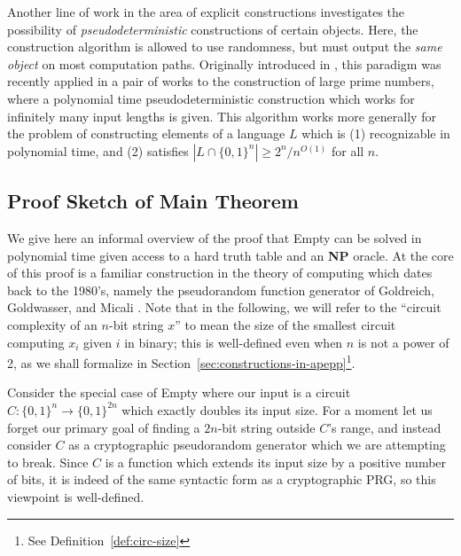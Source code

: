 \documentclass[11pt]{article}
\def\cl{\bf}
\begin{document}
Another line of work in the area of explicit constructions investigates the possibility of \emph{pseudodeterministic} constructions of certain objects. Here, the construction algorithm is allowed to use randomness, but must output the \emph{same object} on most computation paths. Originally introduced in \cite{GG}, this paradigm was recently applied in a pair of works \cite{pseudo-primes, poly-time-primes} to the construction of large prime numbers, where a polynomial time pseudodeterministic construction which works for infinitely many input lengths is given. This algorithm works more generally for the problem of constructing elements of a language $L$ which is (1) recognizable in polynomial time, and (2) satisfies $|L \cap \{0,1\}^n| \geq 2^n/n^{O(1)}$ for all $n$. 


\subsection{Proof Sketch of Main Theorem}
We give here an informal overview of the proof that {\sc Empty} can be solved in polynomial time given access to a hard truth table and an {\cl NP} oracle. At the core of this proof is a familiar construction in the theory of computing which dates back to the 1980's, namely the pseudorandom function generator of Goldreich, Goldwasser, and Micali \cite{GGM}. Note that in the following, we will refer to the ``circuit complexity of an $n$-bit string $x$'' to mean the size of the smallest circuit computing $x_i$ given $i$ in binary; this is well-defined even when $n$ is not a power of 2, as we shall formalize in Section~\ref{sec:constructions-in-apepp}\footnote{See Definition~\ref{def:circ-size}}.

Consider the special case of {\sc Empty} where our input is a circuit $C: \{0,1\}^n \rightarrow \{0,1\}^{2n}$ which exactly doubles its input size. For a moment let us forget our primary goal of finding a $2n$-bit string outside $C$'s range, and instead consider $C$ as a cryptographic pseudorandom generator which we are attempting to break. Since $C$ is a function which extends its input size by a positive number of bits, it is indeed of the same syntactic form as a cryptographic PRG, so this viewpoint is well-defined.
\end{document}
